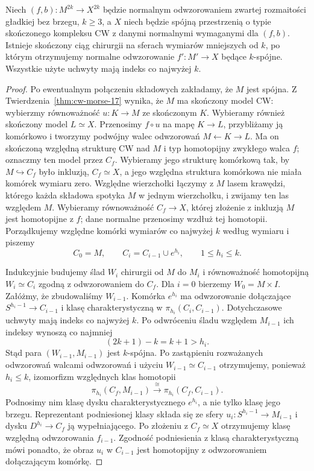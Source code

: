 \begin{stwierdzenie}
\label{prop:skonczona-redukcja-Wall-22}
Niech $(f,b):M^{2k}\to X^{2k}$ będzie normalnym
odwzorowaniem zwartej rozmaitości gładkiej
bez brzegu,
$k\geq3$, a $X$ niech będzie spójną
przestrzenią o typie skończonego kompleksu
CW z danymi normalnymi wymaganymi dla $(f,b)$.
Istnieje skończony
ciąg chirurgii na sferach wymiarów mniejszych
od $k$, po którym otrzymujemy normalne
odwzorowanie $f':M'\to X$ będące
$k$-spójne. Wszystkie użyte uchwyty mają
indeks co najwyżej $k$.
\end{stwierdzenie}
\begin{proof}
Po ewentualnym połączeniu składowych zakładamy,
że $M$ jest spójna. Z
Twierdzenia~\ref{thm:cw-morse-17} wynika,
że $M$ ma skończony model CW: wybierzmy
równoważność $u:K\to M$ ze skończonym $K$.
Wybieramy również skończony model $L\simeq X$.
Przenosimy $f\circ u$ na mapę $K\to L$,
przybliżamy ją komórkowo i tworzymy
podwójny walec odwzorowań
$M\leftarrow K\to L$. Ma on skończoną
względną strukturę CW nad $M$ i typ
homotopijny zwykłego walca $f$;
oznaczmy ten model przez $C_f$. Wybieramy
jego strukturę komórkową tak, by
$M\hookrightarrow C_f$ było inkluzją,
$C_f\simeq X$, a jego względna struktura
komórkowa nie miała komórek wymiaru zero.
Względne wierzchołki łączymy z $M$
lasem krawędzi, którego każda składowa
spotyka $M$ w jednym wierzchołku,
i zwijamy ten las względem $M$. Wybieramy
równoważność $C_f\to X$, której złożenie
z inkluzją $M$ jest homotopijne z $f$;
dane normalne przenosimy wzdłuż tej homotopii.
Porządkujemy względne komórki wymiarów
co najwyżej $k$ według wymiaru i piszemy
\[
 C_0=M,\qquad C_i=C_{i-1}\cup e^{h_i},
 \qquad 1\leq h_i\leq k.
\]

Indukcyjnie budujemy ślad $W_i$ chirurgii
od $M$ do $M_i$ i równoważność homotopijną
$W_i\simeq C_i$ zgodną z odwzorowaniem do
$C_f$. Dla $i=0$ bierzemy $W_0=M\times I$.
Załóżmy, że zbudowaliśmy $W_{i-1}$.
Komórka $e^{h_i}$ ma odwzorowanie dołączające
$S^{h_i-1}\to C_{i-1}$ i klasę
charakterystyczną w
$\pi_{h_i}(C_i,C_{i-1})$. Dotychczasowe
uchwyty mają indeks co najwyżej $k$.
Po odwróceniu śladu względem $M_{i-1}$
ich indeksy wynoszą co najmniej
\[
 (2k+1)-k=k+1>h_i.
\]
Stąd para $(W_{i-1},M_{i-1})$ jest
$k$-spójna. Po zastąpieniu rozważanych
odwzorowań walcami odwzorowań i użyciu
$W_{i-1}\simeq C_{i-1}$ otrzymujemy,
ponieważ $h_i\leq k$, izomorfizm względnych
klas homotopii
\[
 \pi_{h_i}(C_f,M_{i-1})
 \xrightarrow{\ \cong\ }
 \pi_{h_i}(C_f,C_{i-1}).
\]
Podnosimy nim klasę dysku charakterystycznego
$e^{h_i}$, a nie tylko klasę jego brzegu.
Reprezentant podniesionej klasy składa się
ze sfery $u_i:S^{h_i-1}\to M_{i-1}$
i dysku $D^{h_i}\to C_f$ ją wypełniającego.
Po złożeniu z $C_f\simeq X$ otrzymujemy
klasę względną odwzorowania $f_{i-1}$.
Zgodność podniesienia z klasą
charakterystyczną mówi ponadto, że obraz
$u_i$ w $C_{i-1}$ jest homotopijny
z odwzorowaniem dołączającym komórkę.


\end{proof}
